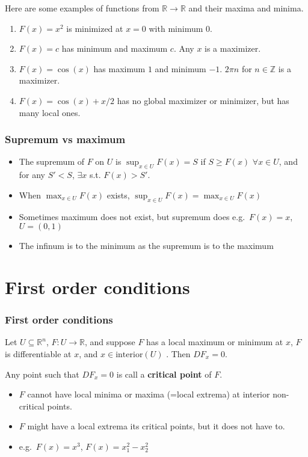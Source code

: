 \documentclass[compress]{beamer}
\def\R{\mathbb{R}}
\renewcommand{\to}{{\rightarrow}}
\begin{document}
\begin{frame}
  \begin{example}
    Here are some examples of functions from $\R \to \R$ and their
    maxima and minima.
    \begin{enumerate}
    \item $F(x) = x^2$ is minimized at $x = 0$ with minimum $0$. 
    \item $F(x) = c$ has minimum and maximum $c$. Any $x$ is a
      maximizer.
    \item $F(x) = \cos(x)$ has maximum $1$ and minimum $-1$. $2\pi n$
      for $n \in \mathbb{Z}$ is a maximizer. 
    \item $F(x) = \cos(x) + x/2$ has no global maximizer or minimizer,
      but has many local ones.
    \end{enumerate}
  \end{example}
\end{frame}

\begin{frame}\frametitle{Supremum vs maximum}
  \begin{itemize}
  \item The supremum of $F$ on $U$ is $\sup_{x \in U} F(x) = S$ if $S
    \geq F(x)$ $\forall x \in U$, and for any $S'<S$, $\exists x$
    s.t. $F(x) > S'$. 
  \item When $\max_{x \in U} F(x)$ exists, $\sup_{x \in U} F(x) =
    \max_{x \in U} F(x)$
  \item Sometimes maximum does not exist, but supremum does e.g.\
    $F(x) = x$, $U = (0,1)$
  \item The infinum is to the minimum as the supremum is to the
    maximum 
  \end{itemize}
\end{frame}

\section{First order conditions}
\begin{frame}\frametitle{First order conditions}
  \begin{theorem}
    Let $U \subseteq \R^n$, $F: U \to \R$,  and suppose $F$ has a local
    maximum or minimum at $x$, $F$ is differentiable at $x$, and $x \in
    \mathrm{interior}(U)$ . Then $DF_x = 0$.  
  \end{theorem}
  
  \begin{definition}
    Any point such that $DF_x = 0$ is call a \textbf{critical point} of
    $F$. 
  \end{definition}
  \begin{itemize}
  \item $F$ cannot have local minima or maxima (=local extrema) at
    interior non-critical points. 
  \item $F$ might have a local extrema its critical
    points, but it does not have to. 
  \item e.g.\ $F(x) = x^3$,  $F(x) = x_1^2 - x_2^2$
  \end{itemize}
\end{frame}
\end{document}
